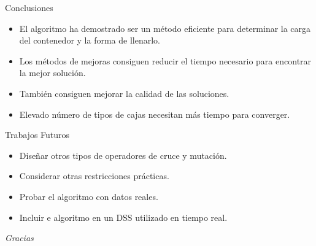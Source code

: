 \documentclass[handout]{beamer}
\begin{document}
\begin{frame}{Conclusiones}
    \begin{itemize}[<+-| alert@+>]
        \item El algoritmo ha demostrado ser un método eficiente para determinar la carga del contenedor y la forma de llenarlo.
        \item Los métodos de mejoras consiguen reducir el tiempo necesario para encontrar la mejor solución.
        \item También consiguen mejorar la calidad de las soluciones.
        \item Elevado número de tipos de cajas necesitan más tiempo para converger.
    \end{itemize}
\end{frame}

\begin{frame}{Trabajos Futuros}
    \begin{itemize}[<+-| alert@+>]
        \item Diseñar otros tipos de operadores de cruce y mutación.
        \item Considerar otras restricciones prácticas.
        \item Probar el algoritmo con datos reales.
        \item Incluir e  algoritmo en un DSS utilizado en tiempo real.
    \end{itemize}
\end{frame}

\begin{frame}
    \begin{center}
        {\Huge \textit{\selectfont Gracias}}
    \end{center}
\end{frame}
\end{document}
